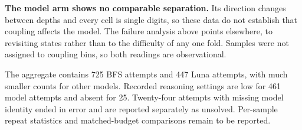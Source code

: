 \textbf{The model arm shows no comparable separation.} Its direction changes between depths and
every cell is single digits, so these data do not establish that coupling affects the model. The
failure analysis above points elsewhere, to revisiting states rather than to the difficulty of
any one fold. Samples were not assigned to coupling bins, so both readings are observational.

\label{sec:results-threats}
The aggregate contains 725 BFS attempts and 447 Luna attempts, with much smaller counts for other
models. Recorded reasoning settings are low for 461 model attempts and absent for 25. Twenty-four
attempts with missing model identity ended in error and are reported separately as unsolved.
Per-sample repeat statistics and matched-budget comparisons remain to be reported.


